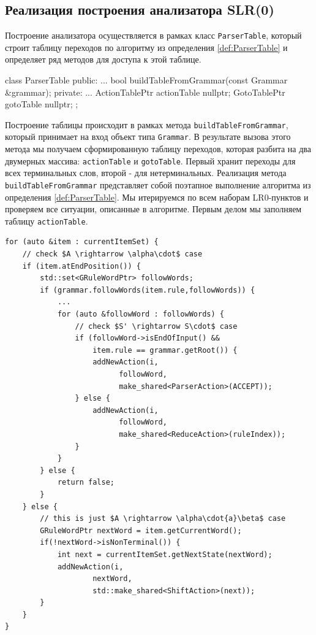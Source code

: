 \subsection{Реализация построения анализатора SLR(0)}
Построение анализатора осуществляется в рамках класс \lstinline{ParserTable}, который строит таблицу переходов по алгоритму из определения \ref{def:ParserTable} и определяет ряд методов для доступа к этой таблице.
\begin{Verb}
class ParserTable {
public:
    ...
    bool buildTableFromGrammar(const Grammar &grammar);
private:
    ...
    ActionTablePtr actionTable {nullptr};
    GotoTablePtr gotoTable {nullptr};
};
\end{Verb}
Построение таблицы происходит в рамках метода \lstinline{buildTableFromGrammar}, который принимает на вход объект типа \lstinline{Grammar}. В результате вызова этого метода мы получаем сформированную таблицу переходов, которая разбита на два двумерных массива: \lstinline{actionTable} и \lstinline{gotoTable}. Первый хранит переходы для всех терминальных слов, второй - для нетерминальных. Реализация метода \lstinline{buildTableFromGrammar} представляет собой поэтапное выполнение алгоритма из определения \ref{def:ParserTable}. Мы итерируемся по всем наборам LR0-пунктов и проверяем все ситуации, описанные в алгоритме. Первым делом мы заполняем таблицу \lstinline{actionTable}.
\begin{lstlisting}[mathescape]
for (auto &item : currentItemSet) {
    // check $A \rightarrow \alpha\cdot$ case
    if (item.atEndPosition()) {
        std::set<GRuleWordPtr> followWords;
        if (grammar.followWords(item.rule,followWords)) {
            ...
            for (auto &followWord : followWords) {
                // check $S' \rightarrow S\cdot$ case
                if (followWord->isEndOfInput() && 
                    item.rule == grammar.getRoot()) {
                    addNewAction(i, 
                          followWord, 
                          make_shared<ParserAction>(ACCEPT));
                } else {
                    addNewAction(i, 
                          followWord, 
                          make_shared<ReduceAction>(ruleIndex));
                }
            }
        } else {
            return false;
        }
    } else {
        // this is just $A \rightarrow \alpha\cdot{a}\beta$ case
        GRuleWordPtr nextWord = item.getCurrentWord();
        if(!nextWord->isNonTerminal()) {
            int next = currentItemSet.getNextState(nextWord);
            addNewAction(i, 
                    nextWord,
                    std::make_shared<ShiftAction>(next));
        }
    }
}
\end{lstlisting}

